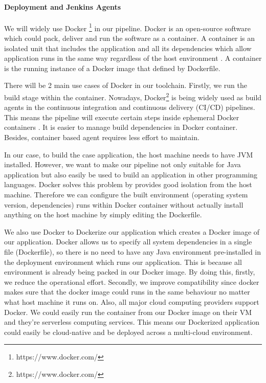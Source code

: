\paragraph[]{Deployment and Jenkins Agents}
We will widely use Docker \footnote{https://www.docker.com/} in our pipeline.
Docker is an open-source software which could pack, deliver and run the software as a container. A container is an isolated unit that includes the application and all its dependencies which allow application runs in the same way regardless of the host environment \cite{WhatisaC60:online}. A container is the running instance of a Docker image that defined by Dockerfile.
\par    
\label{docker}
There will be 2 main use cases of Docker in our toolchain. Firstly, we run the build stage within the container.
Nowadays, Docker\footnote{https://www.docker.com/} is being widely used as build agents in the continuous integration and continuous delivery (CI/CD) pipelines. 
This means the pipeline will execute certain steps inside ephemeral Docker containers \cite{Overview44:online}. It is easier to manage build dependencies in Docker container. Besides, container based agent requires less effort to maintain. 
\par
In our case, to build the case application, the host machine needs to have JVM installed. However, we want to make our pipeline not only suitable for Java application but also easily be used to build an application in other programming languages. Docker solves this problem by provides good isolation from the host machine. Therefore we can configure the built environment (operating system version, dependencies) runs within Docker container without actually install anything on the host machine by simply editing the Dockerfile.
\par
We also use Docker to Dockerize our application which creates a Docker image of our application.
Docker allows us to specify all system dependencies in a single file (Dockerfile), so there is no need to have any Java environment pre-installed in the deployment environment which runs our application. This is because all environment is already being packed in our Docker image. By doing this, firstly, we reduce the operational effort. Secondly, we improve compatibility since docker makes sure that the docker image could runs in the same behaviour no matter what host machine it runs on. Also, all major cloud computing providers support Docker. We could easily run the container from our Docker image on their VM and they're serverless computing services. This means our Dockerized application could easily be cloud-native and be deployed across a multi-cloud environment.
